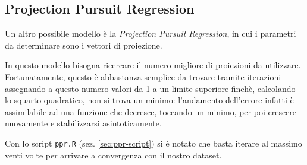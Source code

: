 
\subsection{Projection Pursuit Regression}\label{sec:ppr}
Un altro possibile modello è la \emph{Projection Pursuit Regression}, in cui i
parametri da determinare sono i vettori di proiezione.

In questo modello bisogna ricercare il numero migliore di proiezioni da
utilizzare. Fortunatamente, questo è abbastanza semplice da trovare tramite
iterazioni assegnando a questo numero valori da 1 a un limite superiore
finchè, calcolando lo squarto quadratico, non si trova un minimo: l'andamento
dell'errore infatti è assimilabile ad una funzione che decresce, toccando un
minimo, per poi crescere nuovamente e stabilizzarsi asintoticamente.

Con lo script \texttt{ppr.R} (sez. \ref{sec:ppr-script}) si è notato che basta
iterare al massimo venti volte per arrivare a convergenza con il nostro
dataset.

